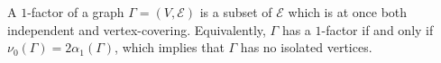 A $1$-factor of a graph $\Gamma = (V, \mathcal{E})$ is a subset of $\mathcal{E}$ which is at once both independent and vertex-covering. Equivalently, $\Gamma$ has a $1$-factor if and only if $\nu_0(\Gamma) = 2\alpha_1(\Gamma)$, which implies that $\Gamma$ has no isolated vertices.
